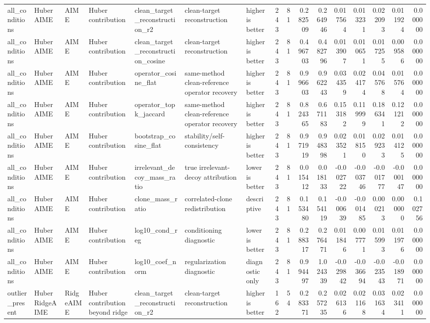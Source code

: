 \begin{table}[t]
\begin{tabular}{lllllllrrrrrrrrr}
all_conditions & HuberAIME & AIME & Huber contribution & clean_target_reconstruction_r2 & clean-target reconstruction & higher is better & 243 & 81 & 0.282509 & 0.264946 & 0.017564 & 0.013231 & 0.022093 & 0.011924 & 0.000000 \\
all_conditions & HuberAIME & AIME & Huber contribution & clean_target_reconstruction_cosine & clean-target reconstruction & higher is better & 243 & 81 & 0.496703 & 0.482796 & 0.013907 & 0.010651 & 0.017255 & 0.009586 & 0.000000 \\
all_conditions & HuberAIME & AIME & Huber contribution & operator_cosine_flat & same-method clean-reference operator recovery & higher is better & 243 & 81 & 0.996603 & 0.962243 & 0.034359 & 0.024174 & 0.045768 & 0.015764 & 0.000000 \\
all_conditions & HuberAIME & AIME & Huber contribution & operator_topk_jaccard & same-method clean-reference operator recovery & higher is better & 243 & 81 & 0.824365 & 0.671183 & 0.153182 & 0.119999 & 0.186341 & 0.121212 & 0.000000 \\
all_conditions & HuberAIME & AIME & Huber contribution & bootstrap_cosine_flat & stability/self-consistency & higher is better & 243 & 81 & 0.971919 & 0.948398 & 0.023521 & 0.018150 & 0.029233 & 0.014125 & 0.000000 \\
all_conditions & HuberAIME & AIME & Huber contribution & irrelevant_decoy_mass_ratio & true irrelevant-decoy attribution & lower is better & 243 & 81 & 0.015412 & 0.018133 & -0.002722 & -0.003746 & -0.001777 & -0.000147 & 0.000000 \\
all_conditions & HuberAIME & AIME & Huber contribution & clone_mass_ratio & correlated-clone redistribution & descriptive & 243 & 81 & 0.153480 & 0.154119 & -0.000639 & -0.001485 & 0.000213 & 0.000000 & 0.102756 \\
all_conditions & HuberAIME & AIME & Huber contribution & log10_cond_reg & conditioning diagnostic & lower is better & 243 & 81 & 0.288317 & 0.276471 & 0.011846 & 0.007771 & 0.015993 & 0.011976 & 0.000000 \\
all_conditions & HuberAIME & AIME & Huber contribution & log10_coef_norm & regularization diagnostic & diagnostic only & 243 & 81 & 0.994497 & 1.024339 & -0.029842 & -0.036694 & -0.023543 & -0.018971 & 0.000000 \\
outlier_present & HuberRidgeAIME & RidgeAIME & Huber contribution beyond ridge & clean_target_reconstruction_r2 & clean-target reconstruction & higher is better & 162 & 54 & 0.283371 & 0.257235 & 0.026136 & 0.021168 & 0.031634 & 0.023411 & 0.000000 \\

\end{tabular}
\end{table}
